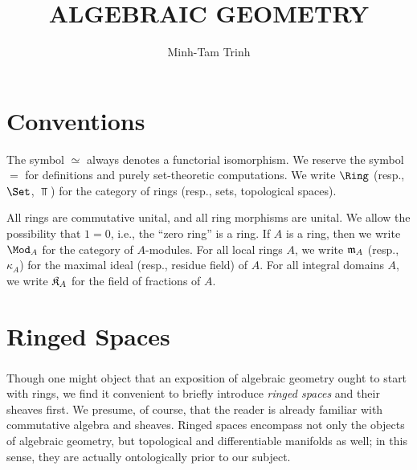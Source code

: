 \documentclass[10pt,final,oneside]{amsbook}
\numberwithin{equation}{section}
\begin{document}
\frontmatter


\title{\MakeUppercase{Algebraic Geometry}}


\author{Minh-Tam Trinh}

\maketitle
\tableofcontents


\mainmatter

\chapter*{Conventions}

The symbol $\simeq$ always denotes a functorial isomorphism.
We reserve the symbol $=$ for definitions and purely set-theoretic computations.
We write $\Ring$ (resp., $\Set$, $\Top$) for the category of rings (resp., sets, topological spaces).

All rings are commutative unital, and all ring morphisms are unital.
We allow the possibility that $1 = 0$, i.e., the ``zero ring'' is a ring.
If $A$ is a ring, then we write $\Mod_A$ for the category of $A$-modules.
For all local rings $A$, we write $\mathfrak{m}_A$ (resp., $\kappa_A$) for the maximal ideal (resp., residue field) of $A$.
For all integral domains $A$, we write $\frak{K}_A$ for the field of fractions of $A$.

\setcounter{chapter}{-1}
\chapter{Ringed Spaces}

\subsection{}

Though one might object that an exposition of algebraic geometry ought to start with rings, we find it convenient to briefly introduce \emph{ringed spaces} and their sheaves first.
We presume, of course, that the reader is already familiar with commutative algebra and sheaves.
Ringed spaces encompass not only the objects of algebraic geometry, but topological and differentiable manifolds as well; in this sense, they are actually ontologically prior to our subject.
\end{document}
